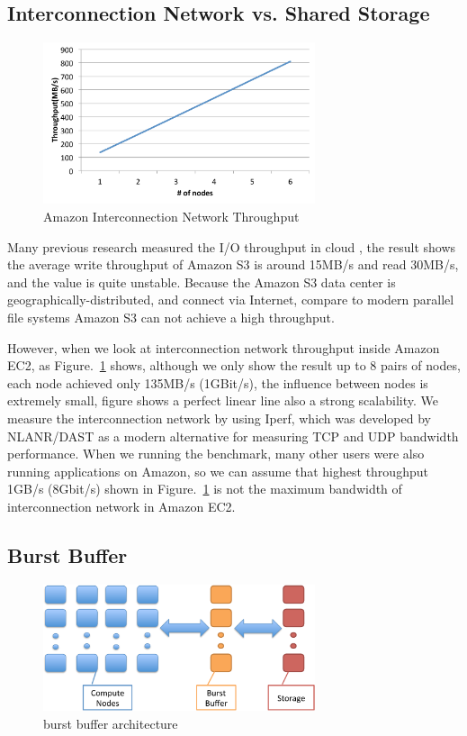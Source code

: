 \subsection{Interconnection Network vs. Shared Storage}
\begin{figure}
\centering
\end{figure}
\begin{figure}
\centering
\includegraphics[width=8cm]{img/amazon_throughput}
\caption{Amazon Interconnection Network Throughput}
\label{background:amazon throughput}
\end{figure}
Many previous research measured the I/O throughput in cloud \cite{Chiba,Transactions_a_la_carte,
Interactive_Use_of_Cloud_Services,Amazon_S3_for_Science_Grids,anevaluation}, the result shows the
average write throughput of Amazon S3 is around 15MB/s and read 30MB/s, and the value is quite
unstable\cite{anevaluation}.
Because the Amazon S3 data center is geographically-distributed, and connect via Internet, compare
to modern parallel file systems Amazon S3 can not achieve a high throughput.

However, when we look at interconnection network throughput inside Amazon EC2, as Figure.~\ref{background:amazon throughput} shows, although we only show the result up to 8 pairs of nodes, each
node achieved only 135MB/s (1GBit/s), the influence between nodes is extremely small, figure shows a perfect linear line also a strong scalability.
We measure the interconnection network by using Iperf\cite{iperf}, which was developed by NLANR/DAST
as a modern alternative for measuring TCP and UDP bandwidth performance.
When we running the
benchmark, many other users were also running applications on Amazon, so we can assume that highest
throughput 1GB/s (8Gbit/s) shown in Figure.~\ref{background:amazon throughput} is not the
maximum bandwidth of interconnection network in Amazon EC2.

\subsection{Burst Buffer}
\begin{figure}
\centering
\includegraphics[width=8cm]{img/burst_buffer.pdf}
\caption{burst buffer architecture}
\label{background:burst buffer architecture}
\end{figure}


